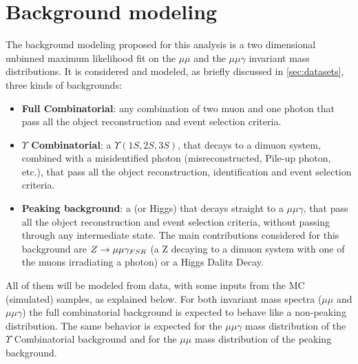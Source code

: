 \clearpage
\section{Background modeling} \label{sec:background_modeling}

The background modeling proposed for this analysis is a two dimensional unbinned maximum likelihood fit on the $\mu\mu$ and the $\mu\mu\gamma$ invariant mass distributions. It is considered and modeled, as briefly discussed in \ref{sec:datasets}, three kinds of backgrounds:


\begin{itemize}
  \item \textbf{Full Combinatorial}: any combination of two muon and one photon that pass all the object reconstruction and event selection criteria.
  \item \textbf{$\Upsilon$ Combinatorial}: a $\Upsilon(1S,2S,3S)$, that decays to a dimuon system, combined with a misidentified photon (misreconstructed, Pile-up photon, etc.), that pass all the object reconstruction, identification and event selection criteria.
  \item \textbf{Peaking background}: a \Z (or Higgs) that decays straight to a $\mu\mu\gamma$, that pass all the object reconstruction and event selection criteria, without passing through any intermediate state. The main contributions considered for this background are $Z \rightarrow \mu\mu\gamma_{\small{FSR}}$ (a Z decaying to a dimuon system with one of the muons irradiating a photon) or a Higgs Dalitz Decay.
\end{itemize}

All of them will be modeled from data, with some inputs from the MC (simulated) samples, as explained below. For both invariant mass spectra ($\mu\mu$ and $\mu\mu\gamma$) the full combinatorial background is expected to behave like a non-peaking distribution. The same behavior is expected for the $\mu\mu\gamma$ mass distribution of the $\Upsilon$ Combinatorial background and for the $\mu\mu$ mass distribution of the peaking background. 

